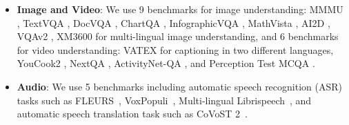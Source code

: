 \begin{itemize}
        FRMT \cite{riley2023frmt}, 
        WikiLingua (Non-English languages) \cite{ladhak2020wikilingua}, 
        TydiQA (no context), TydiQA (GoldP) \cite{tydiqa}, 
        MGSM \cite{mgsm}, 
        translated MMLU \cite{mmlu}, 
        NTREX \cite{federmann-etal-2022-ntrex}, 
        FLORES-200 \cite{flores200}.
    \item \textbf{Image and Video}: We use 9 benchmarks for image understanding:
        MMMU  \cite{mmmu},
        TextVQA \cite{textvqa},
	    DocVQA \cite{docvqa},
	    ChartQA \cite{chartqa},
	    InfographicVQA \cite{infographicvqa},
	    MathVista \cite{MathVista},
	    AI2D \cite{ai2d},
	    VQAv2 \cite{vqav2},
	    XM3600 \cite{xm3600} for multi-lingual image understanding,
	    and 6 benchmarks for video understanding: 
	    VATEX \cite{vatex} for captioning in two different languages,
	    YouCook2 \cite{youcook2},
	    NextQA \cite{nextqa},
	    ActivityNet-QA \cite{activitynetqa}, and 
	    Perception Test MCQA \cite{puatruaucean2023perception}.
    \item \textbf{Audio}:  We use 5 benchmarks including automatic speech recognition (ASR) tasks such as FLEURS~\cite{conneau2023fleurs}, VoxPopuli~\cite{wang2021voxpopuli}, Multi-lingual Librispeech~\cite{pratap2020mls}, and automatic speech translation task such as CoVoST 2~\cite{wang2020covost}.
\end{itemize}







